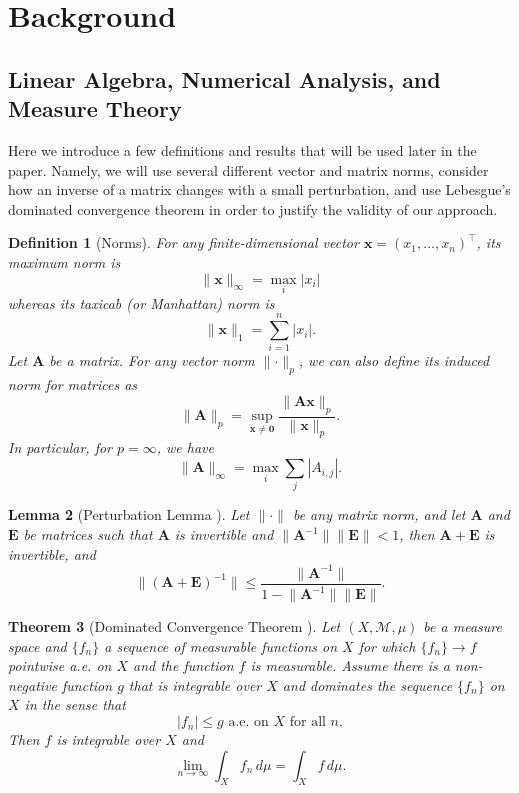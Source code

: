 \documentclass{mpaper}
\newtheorem{theorem}{Theorem}[section]
\newtheorem{lemma}[theorem]{Lemma}
\newtheorem{definition}[theorem]{Definition}
\begin{document}
\section{Background} \label{sec:background}

\subsection{Linear Algebra, Numerical Analysis, and Measure Theory}

Here we introduce a few definitions and results that will be used later in the
paper. Namely, we will use several different vector and matrix norms, consider
how an inverse of a matrix changes with a small perturbation, and use Lebesgue's
dominated convergence theorem in order to justify the validity of our approach.

\begin{definition}[Norms]
  For any finite-dimensional vector $\mathbf{x} = (x_1, \dots, x_n)^\intercal$,
  its \emph{maximum norm} is
  \[
    \lVert \mathbf{x} \rVert_\infty = \max_i |x_i|
  \]
  whereas its \emph{taxicab} (or \emph{Manhattan}) \emph{norm} is
  \[
    \lVert \mathbf{x} \rVert_1 = \sum_{i = 1}^n |x_i|.
  \]
  Let $\mathbf{A}$ be a matrix. For any vector norm $\lVert
  \cdot \rVert_p$, we can also define its \emph{induced norm} for matrices as
  \[
    \lVert \mathbf{A} \rVert_p = \sup_{\mathbf{x} \ne \mathbf{0}} \frac{\lVert
      \mathbf{Ax} \rVert_p}{\lVert \mathbf{x} \rVert_p}.
  \]
  In particular, for $p = \infty$, we have
  \[
    \lVert \mathbf{A} \rVert_\infty = \max_i \sum_{j} |A_{i,j}|.
  \]
\end{definition}

\begin{lemma}[Perturbation Lemma
  \cite{layton2014numerical}] \label{prop:condition_number}
  Let $\lVert \cdot \rVert$ be any matrix norm, and let $\mathbf{A}$ and
  $\mathbf{E}$ be matrices such that $\mathbf{A}$ is invertible and $\lVert
  \mathbf{A}^{-1} \rVert \lVert \mathbf{E} \rVert < 1$, then $\mathbf{A} +
  \mathbf{E}$ is invertible, and
  \[
    \lVert (\mathbf{A} + \mathbf{E})^{-1} \rVert \le \frac{\lVert
      \mathbf{A}^{-1} \rVert}{1 - \lVert \mathbf{A}^{-1} \rVert \lVert
      \mathbf{E} \rVert}.
  \]
\end{lemma}

\begin{theorem}[Dominated Convergence Theorem
  \cite{royden2010real}] \label{thm:lebesgue}
  Let $(X, \mathcal{M}, \mu)$ be a measure space and $\{ f_n \}$ a sequence of
  measurable functions on $X$ for which $\{ f_n \} \to f$ pointwise a.e. on $X$
  and the function $f$ is measurable. Assume there is a non-negative function
  $g$ that is integrable over $X$ and dominates the sequence $\{ f_n \}$ on $X$
  in the sense that
  \[
    |f_n| \le g \text{ a.e. on $X$ for all $n$.}
  \]
  Then $f$ is integrable over $X$ and
  \[
    \lim_{n \to \infty} \int_X f_n\,d\mu = \int_X f\,d\mu.
  \]
\end{theorem}
\end{document}
